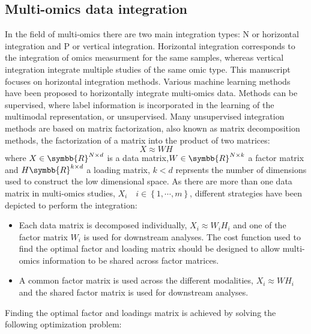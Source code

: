 \documentclass[../main.tex]{subfiles}
\begin{document}


	\subsection{Multi-omics data integration}
		In the field of multi-omics there are two main integration types: N or horizontal integration and P or vertical integration.
		Horizontal integration corresponds to the integration of omics measurment for the same samples, whereas vertical integration integrate multiple studies of the same omic type.
		This manuscript focuses on horizontal integration methods.
		Various machine learning methods have been proposed to horizontally integrate multi-omics data.
		Methods can be supervised, where label information is incorporated in the learning of the multimodal representation, or unsupervised.
		Many unsupervised integration methods are based on matrix factorization, also known as matrix decomposition methods, the factorization of a matrix into the product of two matrices:
		\begin{equation}
			X \approx WH
		\end{equation}
		where \(X \in \symbb{R}^{N\times d}\) is a data matrix,\(W \in \symbb{R}^{N\times k}\) a factor matrix and \(H \symbb{R}^{k\times d}\) a loading matrix, \(k < d\) reprsents the number of dimensions used to construct the low dimensional space.
		As there are more than one data matrix in multi-omics studies, \(X_i\quad i \in \left\{1, \cdots, m\right\}\), different strategies have been depicted to perform the integration:
		\begin{itemize}[nosep]
			\item Each data matrix is decomposed individually, \(X_i \approx W_iH_i\) and one of the factor matrix \(W_i\) is used for downstream analyses. The cost function used to find the optimal factor and loading matrix should be designed to allow multi-omics information to be shared across factor matrices.
			\item A common factor matrix is used across the different modalities, \(X_i \approx WH_i\) and the shared factor matrix is used for downstream analyses.
		\end{itemize}
		Finding the optimal factor and loadings matrix is achieved by solving the following optimization problem:
\end{document}
